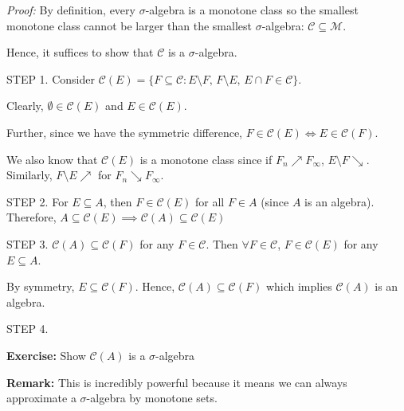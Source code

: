 \documentclass[12pt]{report}
\newcommand{\Cc}{\mathcal{C}}
\newcommand{\M}{\mathcal{M}}
\newcommand{\sub}{\subseteq}
\newcommand*{\tbf}[1]{\ifmmode\mathbf{#1}\else\textbf{#1}\fi}
\newenvironment*{tbox}[2][gray]{
    \begin{tcolorbox}[
        parbox=false,
        colback=#1!5!white,
        colframe=#1!75!black,
        breakable,
        title={#2}
    ]}
    {\end{tcolorbox}}
\newenvironment*{exercise}[1][red]{
    \begin{tcolorbox}[
        parbox=false,
        colback=#1!5!white,
        colframe=#1!75!black,
        breakable
    ]}
    {\end{tcolorbox}}
\begin{document}
    \begin{tbox}{\textbf{Lemma:} Consider $A \sub P(X)$, an algebra. We consider the sigma algebra $\M = \M(A)$ and the monotone class $\Cc = \Cc(A)$ generated by $A$. Then $\M = \Cc$.}
        \emph{Proof:} By definition, every $\sigma$-algebra is a monotone class so the smallest monotone class cannot be larger than the smallest $\sigma$-algebra: $\Cc \sub \M$.

        Hence, it suffices to show that $\Cc$ is a $\sigma$-algebra. 

        STEP 1. Consider $\Cc(E) = \{F \sub \Cc: E \setminus F,\, F \setminus E,\, E \cap F \in \Cc\}$.

        Clearly, $\emptyset \in \Cc(E)$ and $E \in \Cc(E)$.

        Further, since we have the symmetric difference, $F \in \Cc(E) \iff E \in \Cc(F)$. 

        We also know that $\Cc(E)$ is a monotone class since if $F_n \nearrow F_{\infty}$, $E \setminus F \searrow$. Similarly, $F \setminus E \nearrow$ for $F_n \searrow F_{\infty}$.

        STEP 2. For $E \sub A$, then $F \in \Cc(E)$ for all $F \in A$ (since $A$ is an algebra). Therefore, $A \sub \Cc(E) \implies \Cc(A) \sub \Cc(E)$ 

        STEP 3. $\Cc(A)\sub \Cc(F)$ for any $F \in \Cc$. Then $\forall F \in \Cc$, $F \in \Cc(E)$ for any $E \sub A$. 

        By symmetry, $E \sub \Cc(F)$. Hence, $\Cc(A) \sub \Cc(F)$ which implies $\Cc(A)$ is an algebra. 
        
        STEP 4.

        \begin{exercise}
            \textbf{Exercise:} Show $\Cc(A)$ is a $\sigma$-algebra
        \end{exercise}
    \end{tbox}

    \tbf{Remark:} This is incredibly powerful because it means we can always approximate a $\sigma$-algebra by monotone sets. 
    
\end{document}

